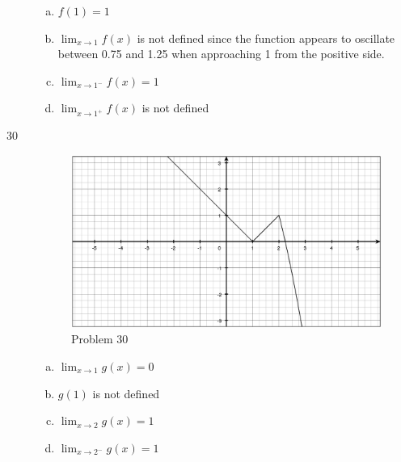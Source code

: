 \documentclass{exam}
\begin{document}
\begin{description}
\begin{enumerate}[(a)]
    \item $f(1) = 1$
    \item $\lim_{x \to 1} f(x)$ is not defined since the function appears to oscillate between 0.75 and 1.25 when approaching 1
      from the positive side.

    \item $\lim_{x \to 1^-} f(x) = 1$ 
    \item $\lim_{x \to 1^+} f(x)$ is not defined

    \end{enumerate}

    \item[30]
    \begin{figure}[H]
      \centering
      \includegraphics[scale=.3]{problem_30.eps}
      \caption*{Problem 30}
    \end{figure}

    \begin{enumerate}[(a)]

    \item $\lim_{x \to 1} g(x) = 0$
    \item $g(1)$ is not defined

    \item $\lim_{x \to 2} g(x) = 1$
    \item $\lim_{x \to 2^-} g(x) = 1$

    \end{enumerate}

  \end{description}
\end{document}
